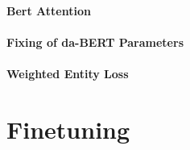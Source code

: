 \documentclass[main.tex]{subfiles}
\begin{document}
\paragraph{Bert Attention}

\paragraph{Fixing of da-BERT Parameters}

\paragraph{Weighted Entity Loss}

\section{Finetuning}
\label{sec:finetuning}
\end{document}
